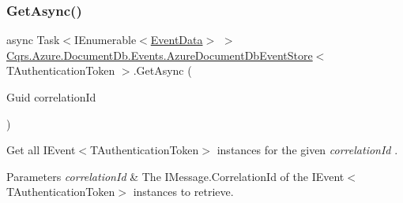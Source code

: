 \subsubsection{\texorpdfstring{Get\+Async()}{GetAsync()}\hspace{0.1cm}{\footnotesize\ttfamily [2/2]}}
{\footnotesize\ttfamily async Task$<$I\+Enumerable$<$\hyperlink{classCqrs_1_1Events_1_1EventData}{Event\+Data}$>$ $>$ \hyperlink{classCqrs_1_1Azure_1_1DocumentDb_1_1Events_1_1AzureDocumentDbEventStore}{Cqrs.\+Azure.\+Document\+Db.\+Events.\+Azure\+Document\+Db\+Event\+Store}$<$ T\+Authentication\+Token $>$.Get\+Async (\begin{DoxyParamCaption}\item[{Guid}]{correlation\+Id }\end{DoxyParamCaption})\hspace{0.3cm}{\ttfamily [protected]}}



Get all I\+Event$<$\+T\+Authentication\+Token$>$ instances for the given {\itshape correlation\+Id} . 


\begin{DoxyParams}{Parameters}
{\em correlation\+Id} & The I\+Message.\+Correlation\+Id of the I\+Event$<$\+T\+Authentication\+Token$>$ instances to retrieve.\\
\hline
\end{DoxyParams}
\mbox{\label{classCqrs_1_1Azure_1_1DocumentDb_1_1Events_1_1AzureDocumentDbEventStore_a2845015d6fda0d9e79b77b82d9452a4d_a2845015d6fda0d9e79b77b82d9452a4d}} 

